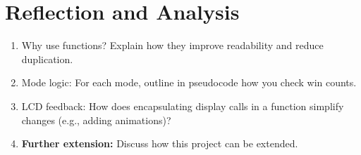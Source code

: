 \documentclass[a4paper,11pt]{article}
\begin{document}
\newpage
\section*{Reflection and Analysis}
\begin{enumerate}
    \item Why use functions? Explain how they improve readability and reduce duplication.

    \item Mode logic: For each mode, outline in pseudocode how you check win counts.

    \item LCD feedback: How does encapsulating display calls in a function simplify changes (e.g., adding animations)?

    \item \textbf{Further extension:} Discuss how this project can be extended. 

\end{enumerate}
\end{document}
